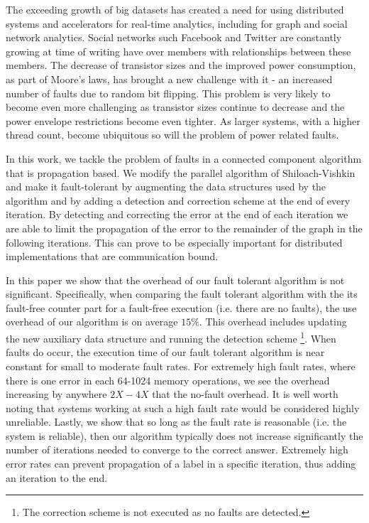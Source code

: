 

The exceeding growth of big datasets has created a need for using distributed systems and 
accelerators for real-time analytics, including for graph and social network analytics. Social 
networks such Facebook and Twitter are constantly growing  at time of writing have over
members with
 relationships between these members.
The decrease of transistor sizes and the improved power consumption, as part of Moore's laws, has 
brought a new challenge with it - an increased number of faults due to random bit flipping. This 
problem is very likely to become even more challenging as transistor sizes continue to decrease and 
the power envelope restrictions become even tighter. As larger systems, with a higher thread count, 
become ubiquitous so will the problem of power related faults.

In this work, we tackle the problem of faults in a connected component algorithm that is 
propagation based. We modify the parallel algorithm of Shiloach-Vishkin \cite{ShiloachVishkin} and 
make it fault-tolerant by augmenting the data structures used by the algorithm and by adding a 
detection and correction scheme at the end of every iteration. By detecting and correcting the 
error at the end of each iteration we are able to limit the propagation of the error to the 
remainder of the graph in the following iterations. This can prove to be especially important for 
distributed implementations that are communication bound.


In this paper we show that the overhead of our fault tolerant algorithm is not significant. 
Specifically, when comparing the fault tolerant algorithm with the its fault-free counter part for 
a fault-free execution (i.e. there are no faults), the use overhead of our algorithm is on average 
$15\%$. This overhead includes updating the new auxiliary data structure and running the detection 
scheme \footnote{The correction scheme is not executed as no faults are detected.}. When faults do 
occur, the execution time of our fault tolerant algorithm is near constant for small to moderate 
fault rates. For extremely high fault rates, where there is one error in each 64-1024 memory 
operations, we see the overhead increasing by anywhere $2X-4X$ that the no-fault overhead. It is 
well worth noting that systems working at such a high fault rate would be considered highly 
unreliable. Lastly, we show that so long as the fault rate is reasonable (i.e. the system is 
reliable), then our algorithm typically does not increase significantly the number of iterations 
needed to converge to the correct answer. Extremely high error rates can prevent propagation of a
label in a specific iteration, thus adding an iteration to the end.

